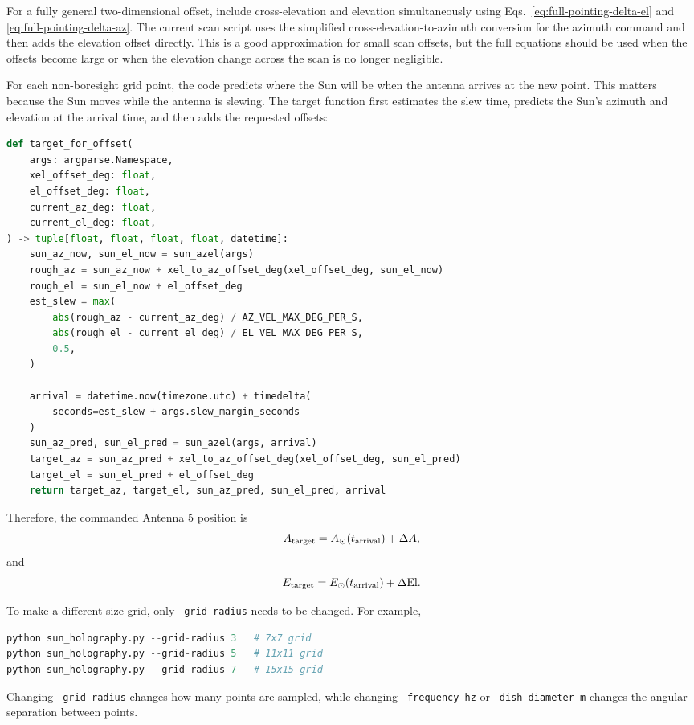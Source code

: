 \documentclass[12pt]{extarticle}
\begin{document}
For a fully general two-dimensional offset, include cross-elevation and elevation simultaneously using Eqs.~\eqref{eq:full-pointing-delta-el} and \eqref{eq:full-pointing-delta-az}. The current scan script uses the simplified cross-elevation-to-azimuth conversion for the azimuth command and then adds the elevation offset directly. This is a good approximation for small scan offsets, but the full equations should be used when the offsets become large or when the elevation change across the scan is no longer negligible.

For each non-boresight grid point, the code predicts where the Sun will be when the antenna arrives at the new point. This matters because the Sun moves while the antenna is slewing. The target function first estimates the slew time, predicts the Sun's azimuth and elevation at the arrival time, and then adds the requested offsets:
\begin{lstlisting}[language=Python]
def target_for_offset(
    args: argparse.Namespace,
    xel_offset_deg: float,
    el_offset_deg: float,
    current_az_deg: float,
    current_el_deg: float,
) -> tuple[float, float, float, float, datetime]:
    sun_az_now, sun_el_now = sun_azel(args)
    rough_az = sun_az_now + xel_to_az_offset_deg(xel_offset_deg, sun_el_now)
    rough_el = sun_el_now + el_offset_deg
    est_slew = max(
        abs(rough_az - current_az_deg) / AZ_VEL_MAX_DEG_PER_S,
        abs(rough_el - current_el_deg) / EL_VEL_MAX_DEG_PER_S,
        0.5,
    )

    arrival = datetime.now(timezone.utc) + timedelta(
        seconds=est_slew + args.slew_margin_seconds
    )
    sun_az_pred, sun_el_pred = sun_azel(args, arrival)
    target_az = sun_az_pred + xel_to_az_offset_deg(xel_offset_deg, sun_el_pred)
    target_el = sun_el_pred + el_offset_deg
    return target_az, target_el, sun_az_pred, sun_el_pred, arrival
\end{lstlisting}
Therefore, the commanded Antenna 5 position is
\begin{equation}
    A_{\rm target}=A_{\odot}(t_{\rm arrival})+\Delta A,
\end{equation}
and
\begin{equation}
    E_{\rm target}=E_{\odot}(t_{\rm arrival})+\Delta\mathrm{El}.
\end{equation}

To make a different size grid, only \texttt{--grid-radius} needs to be changed. For example,
\begin{lstlisting}[language=Python]
python sun_holography.py --grid-radius 3   # 7x7 grid
python sun_holography.py --grid-radius 5   # 11x11 grid
python sun_holography.py --grid-radius 7   # 15x15 grid
\end{lstlisting}
Changing \texttt{--grid-radius} changes how many points are sampled, while changing \texttt{--frequency-hz} or \texttt{--dish-diameter-m} changes the angular separation between points.
\end{document}

